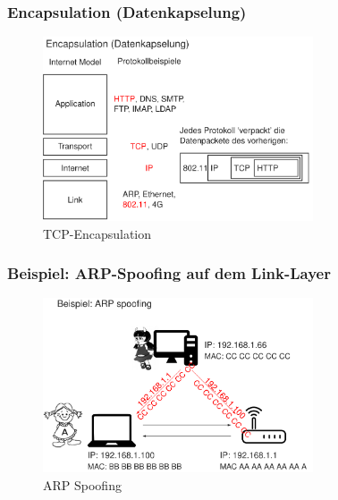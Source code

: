 \documentclass[10pt,a4paper]{article}
\begin{document}
\subsubsection*{Encapsulation (Datenkapselung)}
\begin{figure}[H]
    \begin{center}
    \includegraphics[width=8cm]{images/TCP-Encapsulation.png}
    \caption{TCP-Encapsulation}
    \label{TCP-Encapsulation}
    \end{center}
\end{figure}


\subsubsection*{Beispiel: ARP-Spoofing auf dem Link-Layer}
\begin{figure}[H]
    \begin{center}
    \includegraphics[width=8cm]{images/Beispiel_ARP_Spoofing.png}
    \caption{ARP Spoofing}
    \label{ARP Spoofing}
    \end{center}
\end{figure}
\end{document}
